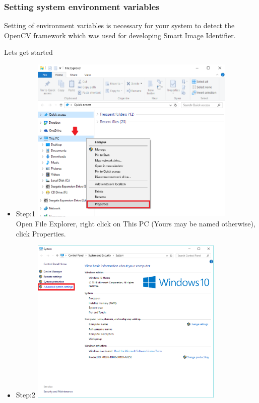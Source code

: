 \documentclass[a4paper,12pt]{report}
\begin{document}
	
	\subsubsection{Setting system environment variables}
	Setting of environment variables is necessary for your system to detect the OpenCV framework
	which was used for developing Smart Image Identifier.
		
	Lets get started
	
	\begin{itemize}
		\item Step:1	\linebreak
		\includegraphics[height=8cm]{../Images/001.png}\\
		\linebreak
		Open File Explorer, right click on This PC (Yours may be named otherwise), click Properties.
		\pagebreak
		\item Step:2	\linebreak
		\includegraphics[height=8cm]{../Images/002.png}\\ 

\end{itemize}
\end{document}
